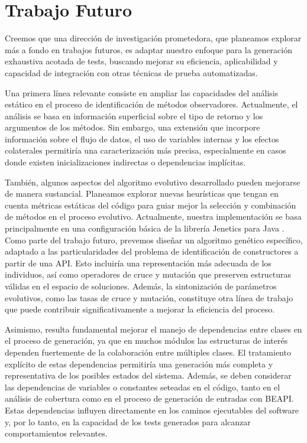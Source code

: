 \chapter{Trabajo Futuro}
\label{cap:future}

Creemos que una dirección de investigación prometedora, que planeamos explorar más a fondo en trabajos futuros, 
es adaptar nuestro enfoque para la generación exhaustiva acotada de tests, buscando mejorar su eficiencia, aplicabilidad y capacidad de integración con otras técnicas de prueba automatizadas.

Una primera línea relevante consiste en ampliar las capacidades del análisis estático en el proceso de identificación de métodos observadores. 
Actualmente, el análisis se basa en información superficial sobre el tipo de retorno y los argumentos de los métodos. 
Sin embargo, una extensión que incorpore información sobre el flujo de datos, el uso de variables internas y los efectos colaterales permitiría una caracterización más precisa, 
especialmente en casos donde existen inicializaciones indirectas o dependencias implícitas.

También, algunos aspectos del algoritmo evolutivo desarrollado pueden mejorarse de manera sustancial. 
Planeamos explorar nuevas heurísticas que tengan en cuenta métricas estáticas del código para guiar mejor la selección y combinación de métodos en el proceso evolutivo. 
Actualmente, nuestra implementación se basa principalmente en una configuración básica de la librería Jenetics para Java \cite{jenetics}. 
Como parte del trabajo futuro, prevemos diseñar un algoritmo genético específico, adaptado a las particularidades del problema de identificación de constructores a partir de una API. 
Esto incluiría una representación más adecuada de los individuos, así como operadores de cruce y mutación que preserven estructuras válidas en el espacio de soluciones. 
Además, la sintonización de parámetros evolutivos, como las tasas de cruce y mutación, constituye otra línea de trabajo que puede contribuir significativamente a mejorar la eficiencia del proceso.

Asimismo, resulta fundamental mejorar el manejo de dependencias entre clases en el proceso de generación, 
ya que en muchos módulos las estructuras de interés dependen fuertemente de la colaboración entre múltiples clases. 
El tratamiento explícito de estas dependencias permitiría una generación más completa y representativa de los posibles estados del sistema. 
Además, se deben considerar las dependencias de variables o constantes seteadas en el código, tanto en el análisis de cobertura como en el proceso de generación de entradas con BEAPI. 
Estas dependencias influyen directamente en los caminos ejecutables del software y, por lo tanto, en la capacidad de los tests generados para alcanzar comportamientos relevantes.

